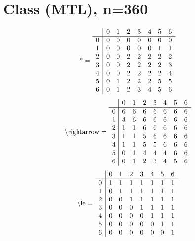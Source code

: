 \documentclass[11pt]{article}
\begin{document}
\section{Class (MTL), n=360}
\[\text{*} = 
\begin{array}{r | r r r r r r r}
 & 0 & 1 & 2 & 3 & 4 & 5 & 6 \\ \hline
0 & 0 & 0 & 0 & 0 & 0 & 0 & 0 \\
1 & 0 & 0 & 0 & 0 & 0 & 1 & 1 \\
2 & 0 & 0 & 2 & 2 & 2 & 2 & 2 \\
3 & 0 & 0 & 2 & 2 & 2 & 2 & 3 \\
4 & 0 & 0 & 2 & 2 & 2 & 2 & 4 \\
5 & 0 & 1 & 2 & 2 & 2 & 5 & 5 \\
6 & 0 & 1 & 2 & 3 & 4 & 5 & 6 \\
\end{array}
\]
\[\text{\textbackslash rightarrow} = 
\begin{array}{r | r r r r r r r}
 & 0 & 1 & 2 & 3 & 4 & 5 & 6 \\ \hline
0 & 6 & 6 & 6 & 6 & 6 & 6 & 6 \\
1 & 4 & 6 & 6 & 6 & 6 & 6 & 6 \\
2 & 1 & 1 & 6 & 6 & 6 & 6 & 6 \\
3 & 1 & 1 & 5 & 6 & 6 & 6 & 6 \\
4 & 1 & 1 & 5 & 5 & 6 & 6 & 6 \\
5 & 0 & 1 & 4 & 4 & 4 & 6 & 6 \\
6 & 0 & 1 & 2 & 3 & 4 & 5 & 6 \\
\end{array}
\]
\[\text{\textbackslash le} = 
\begin{array}{r | r r r r r r r}
 & 0 & 1 & 2 & 3 & 4 & 5 & 6 \\ \hline
0 & 1 & 1 & 1 & 1 & 1 & 1 & 1 \\
1 & 0 & 1 & 1 & 1 & 1 & 1 & 1 \\
2 & 0 & 0 & 1 & 1 & 1 & 1 & 1 \\
3 & 0 & 0 & 0 & 1 & 1 & 1 & 1 \\
4 & 0 & 0 & 0 & 0 & 1 & 1 & 1 \\
5 & 0 & 0 & 0 & 0 & 0 & 1 & 1 \\
6 & 0 & 0 & 0 & 0 & 0 & 0 & 1 \\
\end{array}
\]
\end{document}
